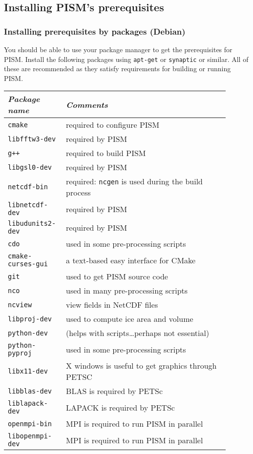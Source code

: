 \documentclass[titlepage,letterpaper,final]{scrartcl}
\begin{document}
\subsection{Installing PISM's prerequisites} \label{subsec:prereq}

\subsubsection{Installing prerequisites by packages (Debian)}
\label{sec:deb-libraries-by-hand}

You should be able to use your package manager to get the prerequisites for PISM.
Install the following packages using \texttt{apt-get} or \texttt{synaptic} or similar.
All of these are recommended as they satisfy requirements for building or running PISM.
\begin{center}
  \begin{tabular*}{0.9\linewidth}{p{0.2\linewidth}p{0.7\linewidth}}
    \toprule
    \emph{Package name} & \emph{Comments}\\
    \midrule
    \texttt{cmake} & required to configure PISM \\
    \texttt{libfftw3-dev} & required by PISM \\
    \texttt{g++} & required to build PISM \\
    \texttt{libgsl0-dev} & required by PISM \\
    \texttt{netcdf-bin} & required: \texttt{ncgen} is used during the build process \\
    \texttt{libnetcdf-dev} & required by PISM \\
    \texttt{libudunits2-dev} & required by PISM \\
    \midrule
    \texttt{cdo} & used in some pre-processing scripts \\
    \texttt{cmake-curses-gui} & a text-based easy interface for CMake \\
    \texttt{git} & used to get PISM source code \\
    \texttt{nco} & used in many pre-processing scripts \\
    \texttt{ncview} & view fields in NetCDF files \\
    \texttt{libproj-dev} & used to compute ice area and volume \\
    \texttt{python-dev} & (helps with scripts\dots perhaps not essential) \\
    \texttt{python-pyproj} & used in some pre-processing scripts \\
    \texttt{libx11-dev} & X windows is useful to get graphics through PETSC \\
    \midrule
    \texttt{libblas-dev} & BLAS is required by PETSc \\
    \texttt{liblapack-dev} & LAPACK is required by PETSc \\
    \texttt{openmpi-bin} & MPI is required to run PISM in parallel \\
    \texttt{libopenmpi-dev} & MPI is required to run PISM in parallel \\
    \bottomrule
  \end{tabular*}
\end{center}
\end{document}
